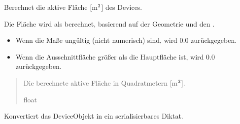 \documentclass[letterpaper,10pt,english]{sphinxmanual}
\begin{document}
\begin{fulllineitems}
\begin{fulllineitems}
\end{fulllineitems}


\begin{fulllineitems}
\label{\detokenize{modulab/device_manager:modules.device.DeviceManager.Device.get_area}}
\pysigstartsignatures
\pysiglinewithargsret
{}
{}
{}
\pysigstopsignatures
\sphinxAtStartPar
Berechnet die aktive Fläche {[}m\(\sp{\text{2}}\){]} des Devices.

\sphinxAtStartPar
Die Fläche wird als  berechnet,
basierend auf der Geometrie und den .
\begin{description}
\begin{itemize}
\item {} 
\sphinxAtStartPar
Wenn die Maße ungültig (nicht numerisch) sind, wird 0.0 zurückgegeben.

\item {} 
\sphinxAtStartPar
Wenn die Ausschnittfläche größer als die Hauptfläche ist,
wird 0.0 zurückgegeben.

\end{itemize}

\end{description}
\begin{quote}\begin{description}
\sphinxAtStartPar
Die berechnete aktive Fläche in Quadratmetern {[}m\(\sp{\text{2}}\){]}.

\sphinxAtStartPar
float

\end{description}\end{quote}

\end{fulllineitems}


\begin{fulllineitems}
\label{\detokenize{modulab/device_manager:modules.device.DeviceManager.Device.to_dict}}
\pysigstartsignatures
\pysiglinewithargsret
{}
{}
{}
\pysigstopsignatures
\sphinxAtStartPar
Konvertiert das Device\sphinxhyphen{}Objekt in ein serialisierbares Diktat.


\end{fulllineitems}
\end{fulllineitems}
\end{document}

